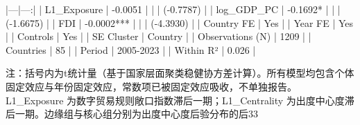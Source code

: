 |---|---:|
| L1_Exposure | -0.0051 |
|  | (-0.7787) |
| log_GDP_PC | -0.1692* |
|  | (-1.6675) |
| FDI | -0.0002*** |
|  | (-4.3930) |
| Country FE | Yes |
| Year FE | Yes |
| Controls | Yes |
| SE Cluster | Country |
| Observations (N) | 1209 |
| Countries | 85 |
| Period | 2005-2023 |
| Within R² | 0.026 |

注：括号内为t统计量（基于国家层面聚类稳健协方差计算）。所有模型均包含个体固定效应与年份固定效应，常数项已被固定效应吸收，不单独报告。
L1_Exposure 为数字贸易规则敞口指数滞后一期；L1_Centrality 为出度中心度滞后一期。边缘组与核心组分别为出度中心度后验分布的后33%